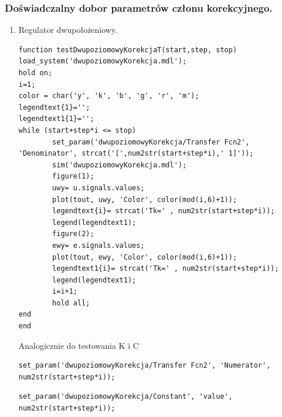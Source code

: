 \documentclass[a4paper,10pt]{article}
\begin{document}
\subsubsection{Doświadczalny dobor parametrów członu korekcyjnego.}\label{sec:zad2_2}
\begin{enumerate}
		\item Regulator dwupołożeniowy.
		
\begin{lstlisting}[caption=Funkcja testująca regulator dwupoziomowy z korekcją zmiana T.]
function testDwupoziomowyKorekcjaT(start,step, stop)
load_system('dwupoziomowyKorekcja.mdl');
hold on;
i=1;
color = char('y', 'k', 'b', 'g', 'r', 'm');
legendtext{1}='';
legendtext1{1}='';
while (start+step*i <= stop)
        set_param('dwupoziomowyKorekcja/Transfer Fcn2', 'Denominator', strcat('[',num2str(start+step*i),' 1]'));
        sim('dwupoziomowyKorekcja.mdl');
        figure(1);
        uwy= u.signals.values;    
        plot(tout, uwy, 'Color', color(mod(i,6)+1));        
        legendtext{i}= strcat('Tk=' , num2str(start+step*i));
        legend(legendtext1);
        figure(2);
        ewy= e.signals.values;    
        plot(tout, ewy, 'Color', color(mod(i,6)+1));        
        legendtext1{i}= strcat('Tk=' , num2str(start+step*i));
        legend(legendtext1);
        i=i+1;
        hold all;
end
end
\end{lstlisting}
Analogicznie do testowania K i C
\begin{lstlisting}[caption=set param dla K.]
set_param('dwupoziomowyKorekcja/Transfer Fcn2', 'Numerator', num2str(start+step*i));
\end{lstlisting}
\begin{lstlisting}[caption=set param dla C.]
set_param('dwupoziomowyKorekcja/Constant', 'value', num2str(start+step*i));
\end{lstlisting}


\end{enumerate}
\end{document}
